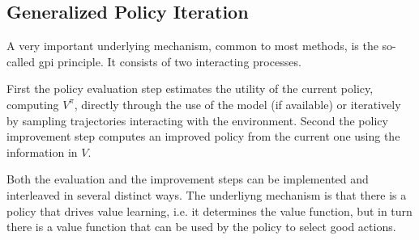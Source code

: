 
\subsection{Generalized Policy Iteration}
A very important underlying mechanism, common to most methods, is the so-called \gls{gpi} principle. 
It consists of two interacting processes. 

First the policy evaluation step estimates the utility
of the current policy, computing $V^{\pi}$, directly through the use of the model (if available)
or iteratively by sampling trajectories interacting with the environment.
Second the policy improvement step computes an improved policy from the current one using the information in $V$. 

Both the evaluation and the improvement steps can be implemented and interleaved in several distinct ways. 
The underliyng mechanism is that there is a policy that drives value learning, i.e. it determines the value function, but in
turn there is a value function that can be used by the policy to select good actions.

